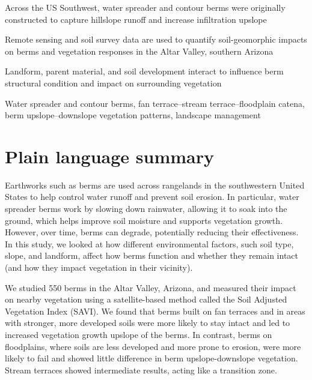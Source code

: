 \documentclass[review]{elsarticle}
\begin{document}
\begin{frontmatter}
\begin{abstract}
\textit{The ave and intended purpose of these structures is often unknown}.
\textit{Questions – soil development, landform stability.}
\end{abstract}

\begin{highlights}
\item{Across the US Southwest, water spreader and contour berms were originally constructed to capture hillslope runoff and increase infiltration upslope}  
\item{Remote sensing and soil survey data are used to quantify soil-geomorphic impacts on berms and vegetation responses in the Altar Valley, southern Arizona} 
\item{Landform, parent material, and soil development interact to influence berm structural condition and impact on surrounding vegetation} 
\end{highlights}

\begin{keyword}
Water spreader and contour berms, fan terrace--stream terrace--floodplain catena, berm upslope--downslope vegetation patterns, landscape management  
\end{keyword}

\end{frontmatter}

\linenumbers

\section*{Plain language summary}

Earthworks such as berms are used across rangelands in the southwestern United States to help control water runoff and prevent soil erosion. In particular, water spreader berms work by slowing down rainwater, allowing it to soak into the ground, which helps improve soil moisture and supports vegetation growth. However, over time, berms can degrade, potentially reducing their effectiveness. In this study, we looked at how different environmental factors, such soil type, slope, and  landform, affect how  berms function and whether they remain intact (and how they impact vegetation in their vicinity). 

We studied 550 berms in the Altar Valley, Arizona, and measured their impact on nearby vegetation using a satellite-based method called the Soil Adjusted Vegetation Index (SAVI). We found that berms built on fan terraces and in areas with stronger, more developed soils were more likely to stay intact and led to increased vegetation growth upslope of the berms. In contrast, berms on floodplains, where soils are less developed and more prone to erosion, were more likely to fail and showed little difference in berm upslope-downslope vegetation. Stream terraces showed intermediate results, acting like a transition zone.
\end{document}
